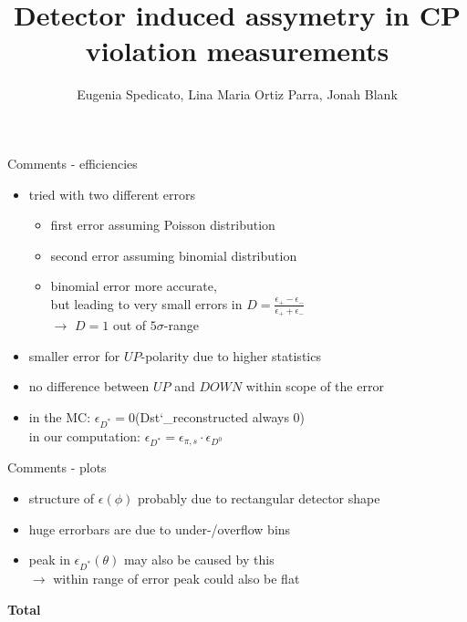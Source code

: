 \documentclass[11pt]{beamer}
\author{Eugenia Spedicato, Lina Maria Ortiz Parra, Jonah Blank}
\title{Detector induced assymetry in CP violation measurements}
\begin{document}
\begin{frame}
\titlepage
\end{frame}


\begin{frame}{Comments - efficiencies}
\begin{itemize}
\item tried with two different errors
\begin{itemize}
\item first error assuming Poisson distribution
\item second error assuming binomial distribution
\item binomial error more accurate,\\
but leading to very small errors in $D=\frac{\epsilon_+ - \epsilon_-}{\epsilon_+ + \epsilon_-}$\\
$\rightarrow$ $D=1$ out of $5\sigma$-range
\end{itemize}
\item smaller error for $UP$-polarity due to higher statistics
\item no difference between $UP$ and $DOWN$ within scope of the error
\item in the MC: $\epsilon_{D^*}=0$(Dst\char`_reconstructed always 0)\\
in our computation: $\epsilon_{D^*}=\epsilon_{\pi,s}\cdot\epsilon_{D^0}$
\end{itemize}
\end{frame}
\begin{frame}{Comments - plots}
\begin{itemize}
\item structure of $\epsilon(\phi)$ probably due to rectangular detector shape
\item huge errorbars are due to under-/overflow bins
\item peak in $\epsilon_{D^*}(\theta)$ may also be caused by this\\
$\rightarrow$ within range of error peak could also be flat 
\end{itemize}
\end{frame}
\begin{frame}
\begin{LARGE}
\textbf{Total}
\end{LARGE}
\end{frame}
\end{document}
